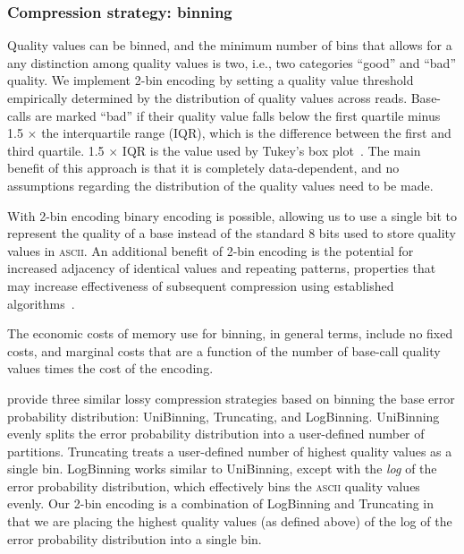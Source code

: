 \subsubsection{Compression strategy: binning}

Quality values can be binned, and the minimum number of bins that
allows for a any distinction among quality values is two, i.e., two
categories ``good'' and ``bad'' quality. We implement 2-bin encoding
by setting a quality value threshold empirically determined by the
distribution of quality values across reads. Base-calls are marked
``bad'' if their quality value falls below the first quartile minus
1.5 $\times$ the interquartile range (IQR), which is the difference
between the first and third quartile. 1.5 $\times$ IQR is the value
used by Tukey's box plot~\cite{mcgill1978variations}. The main
benefit of this approach is that it is completely data-dependent, and
no assumptions regarding the distribution of the quality values need
to be made.

With 2-bin encoding binary encoding is possible, allowing us to use a
single bit to represent the quality of a base instead of the standard
8 bits used to store quality values in \textsc{ascii}. An additional
benefit of 2-bin encoding is the potential for increased adjacency of
identical values and repeating patterns, properties that may increase
effectiveness of subsequent compression using established
algorithms~\cite{HUFFMAN:1952nr,Ziv77auniversal,
  DBLP:journals/tit/ZivL78}.

The economic costs of memory use for binning, in general terms,
include no fixed costs, and marginal costs that are a function of the
number of base-call quality values times the cost of the encoding.

\cite{Wan:2012kq} provide three similar lossy compression strategies based on binning the base error probability distribution: UniBinning, Truncating, and LogBinning.
UniBinning evenly splits the error probability distribution into a user-defined number of partitions.
Truncating treats a user-defined number of highest quality values as a single bin.
LogBinning works similar to UniBinning, except with the \emph{log} of the error probability distribution, which effectively bins the \textsc{ascii} quality values evenly.
Our 2-bin encoding is a combination of LogBinning and Truncating in that we are placing the highest quality values (as defined above) of the log of the error probability distribution into a single bin.


